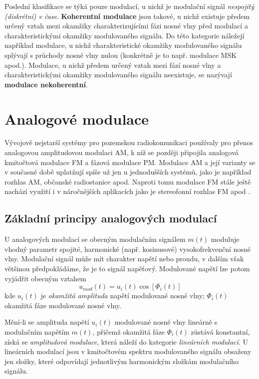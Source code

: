      Poslední klasifikace se týká pouze modulací, u nichž je modulační signál \emph{nespojitý (diskrétní) v 
      čase}. \textbf{Koherentní modulace} jsou takové, u nichž existuje předem určený vztah mezi okamžiky 
      charakterizujícími fázi nosné vlny před modulací a charakteristickými okamžiky modulovaného signálu. Do 
      této kategorie náležejí například modulace, u nichž charakteristické okamžiky modulovaného signálu 
      splývají s průchody nosné vlny nulou (konkrétně je to např. modulace MSK apod.). Modulace, u nichž 
      předem určený vztah mezi fází nosné vlny a charakteristickými okamžiky modulovaného signálu neexistuje, 
      se nazývají \textbf{modulace nekoherentní}.
      
  \section{Analogové modulace}
    Vývojově nejstarší systémy pro pozemskou radiokomunikaci používaly pro přenos analogovou amplitudovou 
    modulaci AM, k níž se později připojila analogová kmitočtová modulace FM a fázová modulace PM. Modulace 
    AM a její varianty se v současné době uplatňují spíše už jen u jednodušších systémů, jako je například 
    rozhlas AM, občanské radiostanice apod. Naproti tomu modulace FM stále ještě nachází využití i v 
    náročnějších aplikacích jako je stereofonní rozhlas FM apod \cite[s.~75]{ZaludRA}.
    
    \subsection{Základní principy analogových modulací}
      U analogových modulací se obecným modulačním signálem \(m(t)\) moduluje vhodný parametr spojité, 
      harmonické (např. kosinusové) vysokofrekvenční nosné vlny. Modulační signál může mít charakter napětí 
      nebo proudu, v dalším však většinou předpokládáme, že je to signál napěťový. Modulované napětí lze 
      potom vyjádřit obecným vztahem
      \begin{equation}\label{eq:RA_mdlc_01}
        u_{mod}(t) = u_i(t)\cos[\Phi_i(t)]
      \end{equation}
      kde \(u_i (t)\) je \emph{okamžitá amplituda} napětí modulované nosné vlny; \(\Phi_i(t)\) okamžitá fáze 
      modulované nosné vlny.
      
      Mění-li se amplituda napětí \(u_i(t)\) modulované nosné vlny lineárně s modulačním napětím \(m(t)\), 
      přičemž okamžitá fáze \(\Phi_i(t)\) zůstává konstantní, získá se \emph{amplitudová modulace}, která 
      náleží do kategorie \emph{lineárních modulací}. U lineárních modulací jsou v kmitočtovém spektru 
      modulovaného signálu obsaženy jen složky, které odpovídají jednotlivým harmonickým složkám modulačního 
      signálu.
      
